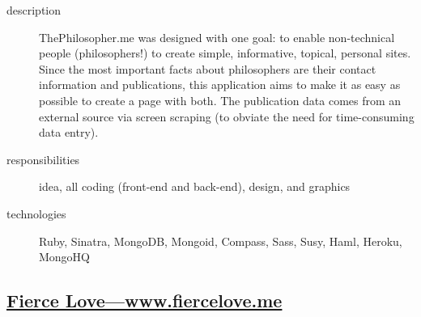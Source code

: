 \documentclass{article}
\begin{document}
\begin{multicols}{2}

\begin{description}
  \item[description] ThePhilosopher.me was designed with one goal: to 
    enable non-technical people (philosophers!) to create simple, 
    informative, topical, personal sites.  Since the most important 
    facts about philosophers are their contact information and 
    publications, this application aims to make it as easy as possible 
    to create a page with both.  The publication data comes from an 
    external source via screen scraping (to obviate the need for 
    time-consuming data entry).
  \item[responsibilities] idea, all coding (front-end and back-end), 
    design, and graphics
  \item[technologies] Ruby, Sinatra, MongoDB, Mongoid, Compass, Sass, 
    Susy, Haml, Heroku, MongoHQ
\end{description}

\vfill
\columnbreak
{}
\end{multicols}


\subsection{\href{http://www.fiercelove.me}
  {Fierce Love---www.fiercelove.me}}
\label{sub:Fierce Love}
\end{document}
